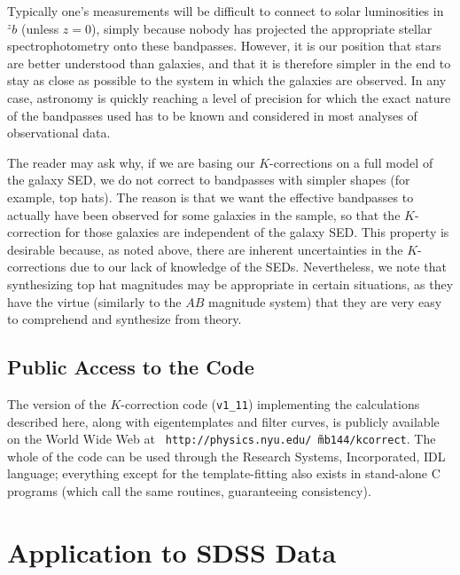 \documentclass[10pt,preprint]{aastex}
\newcommand{\band}[2]{\ensuremath{^{{#1}}\!{#2}}}
\newcommand{\kversion}{{\tt v1\_11}}
\begin{document}
Typically one's measurements will be difficult to connect to solar
luminosities in $\band{z}{b}$ (unless $z=0$), simply because nobody
has projected the appropriate stellar spectrophotometry onto these
bandpasses. However, it is our position that stars are better
understood than galaxies, and that it is therefore simpler in the end
to stay as close as possible to the system in which the galaxies are
observed. In any case, astronomy is quickly reaching a level of
precision for which the exact nature of the bandpasses used has to be
known and considered in most analyses of observational data.

The reader may ask why, if we are basing our $K$-corrections on a full
model of the galaxy SED, we do not correct to bandpasses with simpler
shapes (for example, top hats). The reason is that we want the
effective bandpasses to actually have been observed for some galaxies
in the sample, so that the $K$-correction for those galaxies are
independent of the galaxy SED.  This property is desirable because, as
noted above, there are inherent uncertainties in the $K$-corrections
due to our lack of knowledge of the SEDs. Nevertheless, we note that
synthesizing top hat magnitudes may be appropriate in certain
situations, as they have the virtue (similarly to the $AB$ magnitude
system) that they are very easy to comprehend and synthesize from
theory.

\subsection{Public Access to the Code}

The version of the $K$-correction code (\kversion) implementing the
calculations described here, along with eigentemplates and filter
curves, is publicly available on the World Wide Web at {\tt
http://physics.nyu.edu/\~\ mb144/kcorrect}.  The whole of the code can
be used through the Research Systems, Incorporated, IDL language;
everything except for the template-fitting also exists in stand-alone
C programs (which call the same routines, guaranteeing consistency).

\section{Application to SDSS Data}
\label{data}
\end{document}
